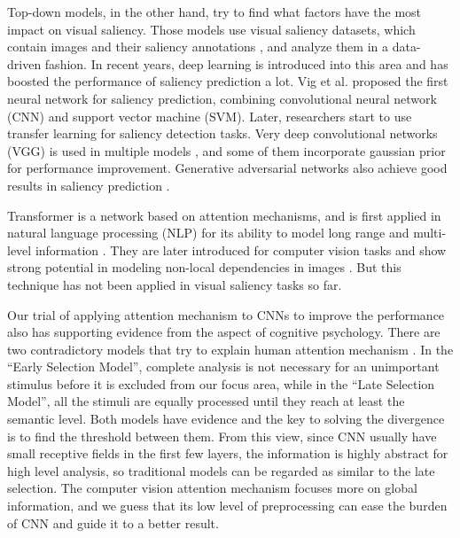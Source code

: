 \documentclass[12pt]{article}
\begin{document}
Top-down models, in the other hand, try to find what factors have the most impact on visual saliency. Those models use visual saliency datasets, which contain images and their saliency annotations
, and analyze them in a data-driven fashion.
In recent years, deep learning is introduced into this area and has boosted the performance of saliency prediction a lot.
Vig et al. \cite{vigLargeScaleOptimizationHierarchical2014} proposed the first neural network for saliency prediction, combining convolutional neural network (CNN) and support vector machine (SVM). Later, researchers start to use transfer learning for saliency 
detection tasks. Very deep convolutional networks (VGG) is used in multiple models \cite{kruthiventiDeepFixFullyConvolutional2015, kummererDeepGazeIIReading2016, corniaPredictingHumanEye2018}, and some of them incorporate gaussian prior for performance improvement.
Generative adversarial networks also achieve good results in saliency prediction \cite{panSalGANVisualSaliency2018, cheHowGazeInfluenced2020}.

Transformer is a network based on attention mechanisms, and is first applied in natural language processing (NLP) for its ability to model long range and multi-level information \cite{bahdanauNeuralMachineTranslation2016a, vaswaniAttentionAllYou2017a}.
They are later introduced for computer vision tasks and show strong potential in modeling non-local dependencies in images \cite{zhangSelfAttentionGenerativeAdversarial2019a}.
But this technique has not been applied in visual saliency tasks so far.

Our trial of applying attention mechanism to CNNs to improve the performance also has supporting evidence from the aspect of cognitive psychology. There are two contradictory models that try to explain human attention mechanism \cite{gazzaniga2006cognitive}. 
In the “Early Selection Model”, complete analysis is not necessary for an unimportant stimulus before it is excluded from our focus area, while in the “Late Selection Model”, all the stimuli are equally processed until they reach at least the semantic level. 
Both models have evidence and the key to solving the divergence is to find the threshold between them. From this view, since CNN usually have small receptive fields in the first few layers, the information is highly abstract for high level analysis, so traditional models can be regarded as similar to the late selection. 
The computer vision attention mechanism focuses more on global information, and we guess that its low level of preprocessing can ease the burden of CNN and guide it to a better result.
\end{document}
